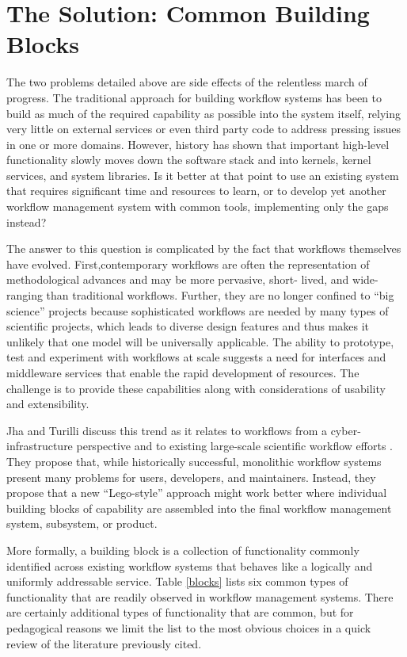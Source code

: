 \section{The Solution: Common Building Blocks}\label{buildings-blocks}

The two problems detailed above are side effects of the relentless march of
progress. The traditional approach for building workflow systems has been to
build as much of the required capability as possible into the system itself,
relying very little on external services or even third party code to address
pressing issues in one or more domains. However, history has shown that
important high-level functionality slowly moves down the software stack and
into kernels, kernel services, and system libraries. Is it better at that
point to use an existing system that requires significant time and resources
to learn, or to develop yet another workflow management system with common
tools, implementing only the gaps instead?

The answer to this question is complicated by the fact that workflows
themselves have evolved. First,contemporary workflows are often the
representation of methodological advances and may be more pervasive,  short-
lived, and wide-ranging than traditional workflows. Further, they are no longer
confined to ``big science'' projects because sophisticated workflows are needed
by many types of scientific projects, which leads to diverse design features and thus
makes it unlikely that one model will be universally applicable.  The ability to prototype, test
and experiment with workflows at scale suggests a need for interfaces and
middleware services that enable the rapid development of resources. The
challenge is to provide these capabilities along with considerations of
usability and extensibility.

Jha and Turilli discuss this trend as it relates to workflows from a 
cyber-infrastructure perspective and to existing large-scale scientific workflow
efforts \cite{jha_building_2016}. They propose that, while historically
successful, monolithic workflow systems present many problems for users,
developers, and maintainers. Instead, they propose that a new ``Lego-style''
approach might work better where individual building blocks of capability
are assembled into the final workflow management system, subsystem, or
product.

More formally, a building block is a collection of functionality commonly
identified across existing workflow systems that behaves like a logically and
uniformly addressable service. Table \ref{blocks} lists six common types of
functionality that are readily observed in workflow management systems. There
are certainly additional types of functionality that are common, but for
pedagogical reasons we limit the list to the most obvious choices in a quick review of the literature previously cited.


